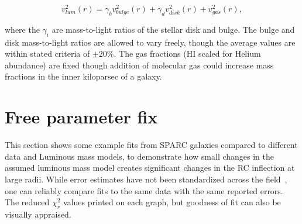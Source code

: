 \documentclass[reprint,%
 amsmath,amssymb,
 aps,
]{revtex4-1}
\begin{document}
  \begin{equation}
v_{lum}^2 (r)= \gamma_b v_{bulge}^2(r) +  \gamma_d v_{disk}^2(r) + v_{gas}^2(r),  
\label{eq:zonte3}
\end{equation} 
 
where the  $\gamma_i$  are  mass-to-light ratios of the stellar disk and bulge.   The    bulge and disk mass-to-light ratios are allowed to vary freely, though the average values are within stated criteria   \cite{2016Lelli} of $\pm 20\%$. The gas fractions (HI scaled for Helium abundance) are fixed though addition of molecular gas could increase mass fractions in the inner kiloparsec of a galaxy. 



 

 
\section{Free parameter fix }
 


This section shows some example fits from SPARC galaxies compared to different data and  Luminous mass models, to demonstrate how small changes in the   assumed  luminous mass model creates significant changes in the RC inflection at large radii. 
While error    estimates have not been standardized across the field~\citep{Blok,Gent,Toky},     one can reliably   compare fits to the same data with the same reported errors. The     reduced $\chi^2_r$ values printed on each graph, but goodness of fit can also be visually appraised.  
 
\end{document}
